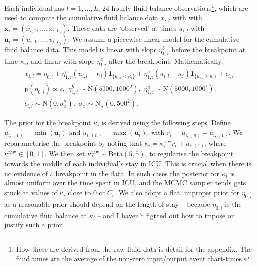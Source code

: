 \documentclass[
  10pt,
  a4paper,
]{article}
\newcommand{\pd}{\text{p}}
\begin{document}
Each individual has \(l = 1, \ldots, L_{i}\) 24-hourly fluid balance
observations\footnote{How these are derived from the raw fluid data is
  detail for the appendix. The fluid times are the average of the
  non-zero input/output event chart-times.}, which are used to compute
the cumulative fluid balance data \(x_{i, l}\) with with
\(\boldsymbol{x}_{i} = (x_{i, 1}, \ldots, x_{i, L_{i}})\). These data
are `observed' at times \(u_{i, l}\) with
\(\boldsymbol{u}_{i} = (u_{i, 1}, \ldots, u_{i, L_{i}})\). We assume a
piecewise linear model for the cumulative fluid balance data. This model
is linear with slope \(\eta_{1, i}^{b}\) before the breakpoint at time
\(\kappa_{i}\), and linear with slope \(\eta_{1, i}^{a}\) after the
breakpoint. Mathematically, \begin{equation}
\begin{gathered}
  x_{i, l} = \eta_{0, i} + \eta^{b}_{1, i}(u_{i, l} - \kappa_{i})\boldsymbol{1}_{\{u_{i, l} < \kappa_{i}\}} + \eta^{a}_{1, i}(u_{i, l} - \kappa_{i})\boldsymbol{1}_{\{u_{i, l} \geq \kappa_{i}\}} + \epsilon_{i, l} \\
  \pd(\eta_{0, i}) \propto c, \,\, \eta^{b}_{1, i} \sim \text{N}(5000, 1000^2), \,\, \eta^{a}_{1, i} \sim \text{N}(5000, 1000^2), \\
  \epsilon_{i, l} \sim \text{N}(0, \sigma^{2}_{x}),  \,\, \sigma_{x} \sim \text{N}_{+}(0, 500^2).
\end{gathered}
\end{equation}

The prior for the breakpoint \(\kappa_{i}\) is derived using the
following steps. Define \(u_{i, (1)} = \min(\boldsymbol{u}_{i})\) and
\(u_{i, (n)} = \max(\boldsymbol{u}_{i})\), with
\(r_{i} = u_{i, (n)} - u_{i, (1)}\). We reparameterise the breakpoint by
noting that \(\kappa_{i} = \kappa^{\text{raw}}_{i}r_{i} + u_{i, (1)}\),
where \(\kappa^{\text{raw}} \in [0, 1]\). We then set
\(\kappa^{\text{raw}}_{i} \sim \text{Beta}(5, 5)\), to regularise the
breakpoint towards the middle of each individual's stay in ICU. This is
crucial when there is no evidence of a breakpoint in the data. In such
cases the posterior for \(\kappa_{i}\) is almost uniform over the time
spent in ICU, and the MCMC sampler tends gets stuck at values of
\(\kappa_{i}\) close to \(0\) or \(C_{i}\). We also adopt a flat,
improper prior for \(\eta_{0, i}\) as a reasonable prior should depend
on the length of stay -- because \(\eta_{0, i}\) is the cumulative fluid
balance at \(\kappa_{i}\) -- and I haven't figured out how to impose or
justify such a prior.
\end{document}
